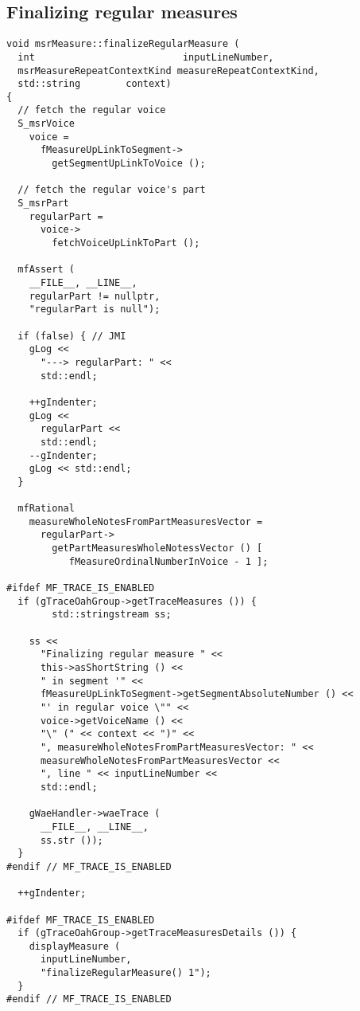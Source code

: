 \subsection{Finalizing regular measures}

\begin{lstlisting}[language=CPlusPlus]
void msrMeasure::finalizeRegularMeasure (
  int                          inputLineNumber,
  msrMeasureRepeatContextKind measureRepeatContextKind,
  std::string        context)
{
  // fetch the regular voice
  S_msrVoice
    voice =
      fMeasureUpLinkToSegment->
        getSegmentUpLinkToVoice ();

  // fetch the regular voice's part
  S_msrPart
    regularPart =
      voice->
        fetchVoiceUpLinkToPart ();

  mfAssert (
    __FILE__, __LINE__,
    regularPart != nullptr,
    "regularPart is null");

  if (false) { // JMI
    gLog <<
      "---> regularPart: " <<
      std::endl;

    ++gIndenter;
    gLog <<
      regularPart <<
      std::endl;
    --gIndenter;
    gLog << std::endl;
  }

  mfRational
    measureWholeNotesFromPartMeasuresVector =
      regularPart->
        getPartMeasuresWholeNotessVector () [
           fMeasureOrdinalNumberInVoice - 1 ];

#ifdef MF_TRACE_IS_ENABLED
  if (gTraceOahGroup->getTraceMeasures ()) {
		std::stringstream ss;

    ss <<
      "Finalizing regular measure " <<
      this->asShortString () <<
      " in segment '" <<
      fMeasureUpLinkToSegment->getSegmentAbsoluteNumber () <<
      "' in regular voice \"" <<
      voice->getVoiceName () <<
      "\" (" << context << ")" <<
      ", measureWholeNotesFromPartMeasuresVector: " <<
      measureWholeNotesFromPartMeasuresVector <<
      ", line " << inputLineNumber <<
      std::endl;

    gWaeHandler->waeTrace (
      __FILE__, __LINE__,
      ss.str ());
  }
#endif // MF_TRACE_IS_ENABLED

  ++gIndenter;

#ifdef MF_TRACE_IS_ENABLED
  if (gTraceOahGroup->getTraceMeasuresDetails ()) {
    displayMeasure (
      inputLineNumber,
      "finalizeRegularMeasure() 1");
  }
#endif // MF_TRACE_IS_ENABLED


\end{lstlisting}

